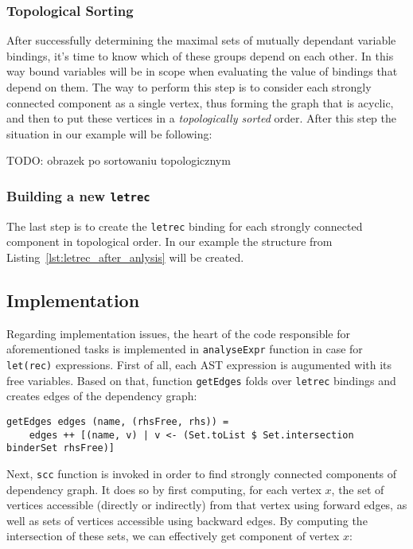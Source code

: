 \documentclass[a4paper]{report}
\begin{document}
\subsubsection{Topological Sorting}
After successfully determining the maximal sets of mutually dependant variable
bindings, it's time to know which of these groups depend on each other. In this
way bound variables will be in scope when evaluating the value of bindings that
depend on them. The way to perform this step is to consider each strongly
connected component as a single vertex, thus forming the graph that is acyclic,
and then to put these vertices in a \textit{topologically sorted} order. After
this step the situation in our example will be following:

TODO: obrazek po sortowaniu topologicznym


\subsubsection{Building a new \texttt{letrec}}
The last step is to create the \texttt{letrec} binding for each strongly
connected component in topological order. In our example the structure from
Listing~\ref{lst:letrec_after_anlysis} will be created.


\subsection{Implementation}
Regarding implementation issues, the heart of the code responsible for
aforementioned tasks is implemented in \texttt{analyseExpr} function in case
for \texttt{let(rec)} expressions. First of all, each AST expression is
augumented with its free variables. Based on that, function \texttt{getEdges}
folds over \texttt{letrec} bindings and creates edges of the dependency graph:

\begin{lstlisting}
getEdges edges (name, (rhsFree, rhs)) =
    edges ++ [(name, v) | v <- (Set.toList $ Set.intersection binderSet rhsFree)]
\end{lstlisting}

Next, \texttt{scc} function is invoked in order to find strongly connected
components of dependency graph. It does so by first computing, for each vertex
$x$, the set of vertices accessible (directly or indirectly) from that vertex
using forward edges, as well as sets of vertices accessible using backward
edges. By computing the intersection of these sets, we can effectively get
component of vertex $x$:
\end{document}
